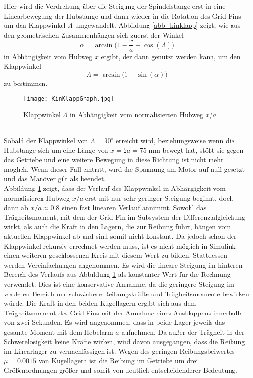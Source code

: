 Hier wird die Verdrehung über die Steigung der Spindelstange erst in eine Linearbewegung der Hubstange und dann wieder in die Rotation des Grid Fins um den Klappwinkel $\Lambda$ umgewandelt. Abbildung \ref{abb_kinklapp} zeigt, wie aus den geometrischen Zusammenhängen sich zuerst der Winkel
\begin{equation}
	\alpha=\arcsin\bigg(1-\frac{x}{a}-\cos(\Lambda)\bigg)
\end{equation}
in Abhängigkeit vom Hubweg $x$ ergibt, der dann genutzt werden kann, um den Klappwinkel
\begin{equation}
	\Lambda = \arcsin\bigg(1-\sin(\alpha)\bigg)
\end{equation}
zu bestimmen.
\begin{figure}[h] 
	\centering
	\texttt{[image: KinKlappGraph.jpg]}
	\caption{Klappwinkel $\Lambda$ in Abhängigkeit vom normalisierten Hubweg $x/a$}
	\label{abb_KinKlappGraph}
\end{figure}\\	
Sobald der Klappwinkel von $\Lambda = 90^\circ$ erreicht wird, beziehungsweise wenn die Hubstange sich um eine Länge von $x = 2a = 75$ mm bewegt hat, stößt sie gegen das Getriebe und eine weitere Bewegung in diese Richtung ist nicht mehr möglich. Wenn dieser Fall eintritt, wird die Spannung am Motor auf null gesetzt und das Manöver gilt als beendet.
\\
Abbildung \ref{abb_KinKlappGraph} zeigt, dass der Verlauf des Klappwinkel in Abhängigkeit vom normalisieren Hubweg $x/a$ erst mit nur sehr geringer Steigung beginnt, doch dann ab $x/a \approx 0.8$ einen fast linearen Verlauf annimmt. Sowohl das Trägheitsmoment, mit dem der Grid Fin im Subsystem der Differenzialgleichung wirkt, als auch die Kraft in den Lagern, die zur Reibung führt, hängen vom aktuellen Klappwinkel ab und sind somit nicht konstant. Da jedoch schon der Klappwinkel rekursiv errechnet werden muss, ist es nicht möglich in Simulink einen weiteren geschlossenen Kreis mit diesem Wert zu bilden. Stattdessen werden Vereinfachungen angenommen. Es wird die lineare Steigung im hinteren Bereich des Verlaufs aus Abbildung \ref{abb_KinKlappGraph} als konstanter Wert für die Rechnung verwendet. Dies ist eine konservative Annahme, da die geringere Steigung im vorderen Bereich nur schwächere Reibungskräfte und Trägheitsmomente bewirken würde. Die Kraft in den beiden Kugellagern ergibt sich aus dem Trägheitsmoment des Grid Fins mit der Annahme eines Ausklappens innerhalb von zwei Sekunden. Es wird angenommen, dass in beide Lager jeweils das gesamte Moment mit dem Hebelarm $a$ aufnehmen. Da außer der Trägheit in der Schwerelosigkeit keine Kräfte wirken, wird davon ausgegangen, dass die Reibung im Linearlager zu vernachlässigen ist. Wegen des geringen Reibungsbeiwertes $\mu = 0.0015$ \cite{lagerreibung} von Kugellagern ist die Reibung im Getriebe um drei Größenordnungen größer und somit von deutlich entscheidenderer Bedeutung.

